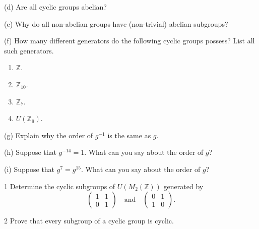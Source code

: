 \begin{problem}[Warmup]{(d)}
    Are all cyclic groups abelian?
\end{problem}
\unsolved

\begin{problem}[Warmup]{(e)}
    Why do all non-abelian groups have (non-trivial) abelian subgroups?
\end{problem}
\unsolved

\begin{problem}[Warmup]{(f)}
    How many different generators do the following cyclic groups possess? List all such generators.
    \begin{enumerate}
        \item[(a)] $\mathbb{Z}$.
        \item[(b)] $\mathbb{Z}_{10}$.
        \item[(c)] $\mathbb{Z}_7$.
        \item[(d)] $U(\mathbb{Z}_9)$.
    \end{enumerate}
\end{problem}
\unsolved

\begin{problem}[Warmup]{(g)}
    Explain why the order of $g^{-1}$ is the same as $g$.
\end{problem}
\unsolved

\begin{problem}[Warmup]{(h)}
    Suppose that $g^{-14} = 1$. What can you say about the order of $g$?
\end{problem}
\unsolved

\begin{problem}[Warmup]{(i)}
    Suppose that $g^7 = g^{15}$. What can you say about the order of $g$?
\end{problem}
\unsolved

\begin{problem}{1}
    Determine the cyclic subgroups of $U(M_2(\mathbb{Z}))$ generated by
    \[\begin{pmatrix} 1 & 1 \\ 0 & 1 \end{pmatrix} \quad\text{and}\quad
    \begin{pmatrix} 0 & 1 \\ 1 & 0 \end{pmatrix}.\]
\end{problem}
\unsolved

\begin{problem}{2}
    Prove that every subgroup of a cyclic group is cyclic.
\end{problem}
\solved

